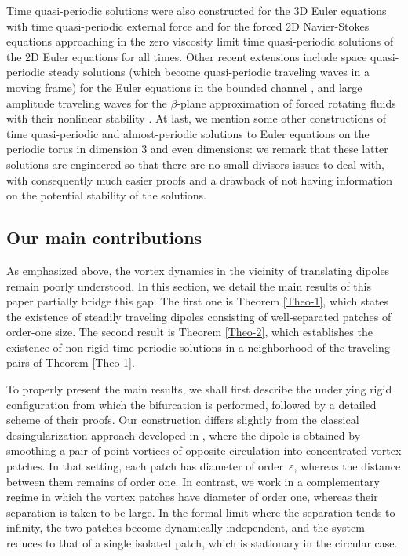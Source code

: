 \documentclass[a4paper,reqno,10pt]{article}
\begin{document}
Time quasi-periodic solutions were also constructed for the 3D Euler equations with time quasi-periodic external force \cite{BM20} and for the forced 2D Navier-Stokes
equations \cite{FrMo} approaching in the zero viscosity limit time quasi-periodic solutions of the 2D Euler equations for all times. Other recent extensions include space quasi-periodic steady solutions (which become quasi-periodic traveling waves in a moving frame) for the Euler equations in the bounded channel \cite{FMM24}, and large amplitude traveling waves for the $\beta$-plane approximation of forced rotating fluids \cite{BFMT25} with their nonlinear stability \cite{FFM26}. 
At last, we mention some other constructions of time quasi-periodic and almost-periodic solutions to Euler equations \cite{CF13,EPSL23,FM24} on the periodic torus in dimension $3$ and even dimensions:   we remark that these latter solutions are engineered so that there are no small divisors issues to deal with, with consequently much easier proofs and a drawback of not having information on the potential stability of the solutions. 



\subsection{Our main contributions}\label{time-periodic section}

As emphasized above, the vortex dynamics  in the vicinity of translating dipoles remain poorly understood. 
In this section, we detail the main results of this paper partially bridge this gap. The first one is Theorem \ref{Theo-1}, which states the existence of steadily traveling dipoles consisting of well-separated patches of order-one size. The second result is Theorem \ref{Theo-2}, which establishes the existence of non-rigid time-periodic solutions in a neighborhood of the traveling pairs of Theorem \ref{Theo-1}.

To properly present the main results, we shall first describe the underlying rigid configuration from which the bifurcation is performed, followed by a detailed scheme of their proofs. 
Our construction differs slightly from the classical desingularization approach developed in \cite{Hmidi}, where the dipole is obtained by smoothing a pair of point vortices of opposite circulation into concentrated vortex patches. In that setting, each patch has diameter of \mbox{order $\varepsilon$,} whereas the distance between them remains of order one.
In contrast, we work in a complementary regime in which the vortex patches have diameter of order one, whereas their separation is taken to be large. In the formal limit where the separation tends to infinity, the two patches become dynamically independent, and the system reduces to that of  a single isolated patch, which is stationary in the circular case.
\end{document}
